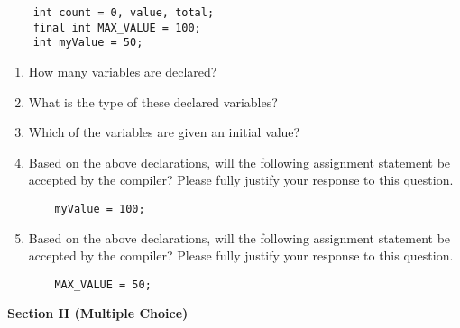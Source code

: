 \documentclass[12pt]{article}
\begin{document}
\begin{enumerate}
\hspace*{.25in}
\begin{minipage}{6in}
  \begin{lstlisting}
    int count = 0, value, total;
    final int MAX_VALUE = 100;
    int myValue = 50;
  \end{lstlisting}
\end{minipage}

\begin{enumerate}

\item How many variables are declared?
  \vspace*{1in}

\item What is the type of these declared variables?
  \vspace*{1in}

\item Which of the variables are given an initial value?
  \vspace*{1in}

\item Based on the above declarations, will the following assignment
  statement be accepted by the compiler?  Please fully justify your
  response to this question.


\begin{minipage}{6in}
  \begin{lstlisting}
    myValue = 100;
  \end{lstlisting}
\end{minipage}
  \vspace*{1in}

\item Based on the above declarations, will the following assignment
  statement be accepted by the compiler?  Please fully justify your
  response to this question.
  

\begin{minipage}{6in}
  \begin{lstlisting}
    MAX_VALUE = 50;
  \end{lstlisting}
\end{minipage}

\end{enumerate}

\end{enumerate}

\newpage

\noindent
{\bf Section II (Multiple Choice)}
\end{document}
